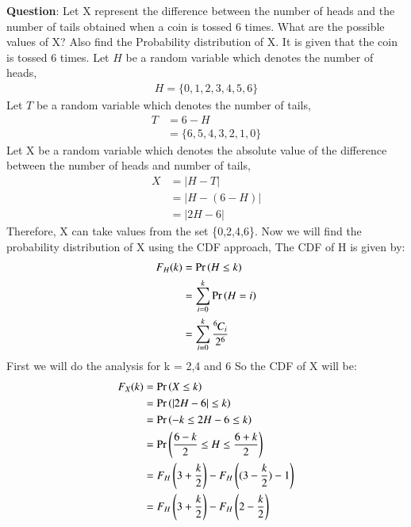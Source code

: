 \documentclass[journal,12pt,onecolumn]{IEEEtran}
\theoremstyle{remark}
\begin{document}
%
\textbf{Question}:
Let X represent the difference between the number of heads and the number of tails obtained when a coin is tossed 6 times. What are the possible values of X? Also find the Probability distribution of X.
\newline
\solution
\newline
It is given that the coin is tossed 6 times.
\newline
Let $H$ be a random variable which denotes the number of heads,
\begin{align}
      H = \{0,1,2,3,4,5,6\}
\end{align}
Let $T$ be a random variable which denotes the number of tails,
\begin{align}
      T &= 6 - H \\
        &= \{6,5,4,3,2,1,0\}
\end{align}
Let X be a random variable which denotes the absolute value of the difference between the number of heads and number of tails,
\begin{align}  
      X &= |H - T| \\
        &= |H - (6 - H)| \\
        &= |2H - 6| 
\end{align} 
Therefore, X can take values from the set \{0,2,4,6\}.  
\newline
Now we will find the probability distribution of X using the CDF approach,
\newline
The CDF of H is given by:
\begin{align}
F_H(k) &= \Pr\left(H \leq k\right) \\
       &=   \sum_{i=0}^{k} \Pr\left(H=i\right) \\ 
       &=   \sum_{i=0}^{k} \frac{{{}^{6}\mkern-1muC_{i}}}{2^6}
\end{align}
First we will do the analysis for k = 2,4 and 6
\newline
So the CDF of X will be:
\begin{align}
F_X(k) &= \Pr\left(X \leq k\right) \\
       &= \Pr\left(|2H-6| \leq k\right) \\
       &= \Pr\left(-k \leq 2H-6 \leq k\right) \\
       &= \Pr\left(\frac{6-k}{2} \leq H \leq \frac{6+k}{2}\right) \\
       &= F_H\left(3+\frac{k}{2}\right) - F_H\left((3-\frac{k}{2})-1\right) \\
       &= F_H\left(3+\frac{k}{2}\right) - F_H\left(2-\frac{k}{2}\right)
\end{align}
\end{document}
